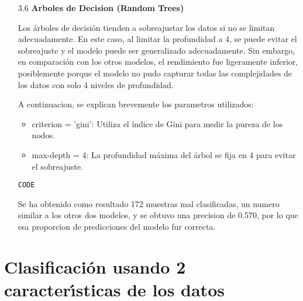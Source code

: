 \documentclass{article}
\begin{document}
\begin{itemize}

\item[3.6]  {\bf Arboles de Decision (Random Trees)}

Los árboles de decisión tienden a sobreajustar los datos si no se limitan adecuadamente. En este caso, al limitar la profundidad a 4, se puede evitar el sobreajuste y el modelo puede ser generalizado adecuadamente. Sin embargo, en comparación con los otros modelos, el rendimiento fue ligeramente inferior, posiblemente porque el modelo no pudo capturar todas las complejidades de los datos con solo 4 niveles de profundidad.

A continuacion, se explican brevemente los parametros utilizados:

\begin{itemize}

\item
criterion = 'gini': Utiliza el índice de Gini para medir la pureza de los nodos.

\item
max-depth = 4: La profundidad máxima del árbol se fija en 4 para evitar el sobreajuste.

\end{itemize}

\begin{tcolorbox}[width=14cm]
\begin{scriptsize}
\begin{verbatim}
CODE
\end{verbatim}
\end{scriptsize}
\end{tcolorbox}

Se ha obtenido como resultado 172 muestras mal clasificadas, un numero similar a los otros dos modelos, y se obtuvo una precision de 0.570, por lo que esa proporcion de  predicciones del modelo fur correcta.

\end{itemize}


\newpage

\section[4]{Clasificaci\'on usando 2 caracter\'{\i}sticas de los datos}
\end{document}
